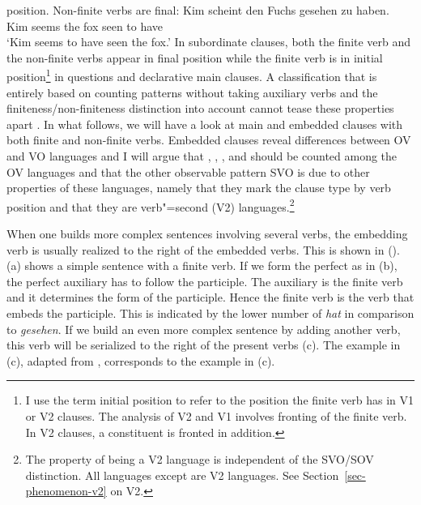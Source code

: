 position. Non-finite verbs are final: 
\ea
\gll Kim scheint den Fuchs gesehen zu haben.\\
     Kim seems   the fox  seen to have\\
\glt `Kim seems to have seen the fox.'
\z
In subordinate clauses, both the finite verb and the non-finite verbs appear in final position while
the finite verb is in initial position\footnote{%
  I use the term initial position to refer to the position the finite verb has in V1 or V2 clauses. The
  analysis of V2 and V1 involves fronting of the finite verb. In V2 clauses, a constituent is fronted
  in addition.
} in questions and declarative main clauses.
A classification that is entirely based on counting patterns without taking auxiliary verbs and the
finiteness/non-finiteness distinction into account cannot tease these properties apart \citep[Section~3]{HoehleTopo}. In what follows, we will have a look at main and embedded clauses with
both finite and non-finite verbs. Embedded clauses reveal differences between OV and VO languages and I will argue that , ,
, and  should be counted among the OV languages and that the other observable pattern
SVO is due to other properties of these languages, namely that they mark the clause type by verb
position and that they are verb"=second (V2) languages.\footnote{%
  The property of being a V2 language is independent of the SVO/SOV distinction. All 
  languages except  are V2 languages. See Section~\ref{sec-phenomenon-v2} on V2.
}

When one builds more complex  sentences involving several verbs, the embedding verb is usually
realized to the right of the embedded verbs. 
This is shown in (). (a) shows a simple
sentence with a finite verb. If we form the perfect as in (b), the perfect auxiliary has to
follow the participle. The auxiliary is the finite verb and it determines the form of the
participle. Hence the finite verb is the verb that embeds the participle. This is indicated by the
lower number of \emph{hat} in comparison to \emph{gesehen}. If we build an even more complex
sentence by adding another verb, this verb will be serialized to the right of the present verbs
(c).  The  example in (c), adapted from \citet[]{Oersnes2009b}, corresponds to the
 example in (c).

